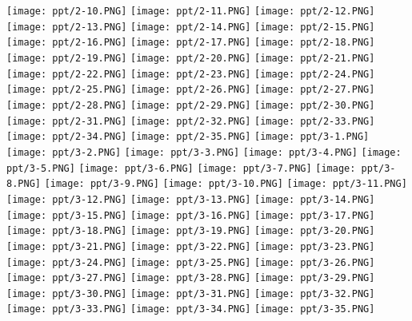 \documentclass[UTF-8]{ctexart}
\begin{document}
\begin{center}
\texttt{[image: ppt/2-10.PNG]}
\texttt{[image: ppt/2-11.PNG]}
\texttt{[image: ppt/2-12.PNG]}
\texttt{[image: ppt/2-13.PNG]}
\texttt{[image: ppt/2-14.PNG]}
\texttt{[image: ppt/2-15.PNG]}
\texttt{[image: ppt/2-16.PNG]}
\texttt{[image: ppt/2-17.PNG]}
\texttt{[image: ppt/2-18.PNG]}
\texttt{[image: ppt/2-19.PNG]}
\texttt{[image: ppt/2-20.PNG]}
\texttt{[image: ppt/2-21.PNG]}
\texttt{[image: ppt/2-22.PNG]}
\texttt{[image: ppt/2-23.PNG]}
\texttt{[image: ppt/2-24.PNG]}
\texttt{[image: ppt/2-25.PNG]}
\texttt{[image: ppt/2-26.PNG]}
\texttt{[image: ppt/2-27.PNG]}
\texttt{[image: ppt/2-28.PNG]}
\texttt{[image: ppt/2-29.PNG]}
\texttt{[image: ppt/2-30.PNG]}
\texttt{[image: ppt/2-31.PNG]}
\texttt{[image: ppt/2-32.PNG]}
\texttt{[image: ppt/2-33.PNG]}
\texttt{[image: ppt/2-34.PNG]}
\texttt{[image: ppt/2-35.PNG]}
\newpage
\texttt{[image: ppt/3-1.PNG]}
\texttt{[image: ppt/3-2.PNG]}
\texttt{[image: ppt/3-3.PNG]}
\texttt{[image: ppt/3-4.PNG]}
\texttt{[image: ppt/3-5.PNG]}
\texttt{[image: ppt/3-6.PNG]}
\texttt{[image: ppt/3-7.PNG]}
\texttt{[image: ppt/3-8.PNG]}
\texttt{[image: ppt/3-9.PNG]}
\texttt{[image: ppt/3-10.PNG]}
\texttt{[image: ppt/3-11.PNG]}
\texttt{[image: ppt/3-12.PNG]}
\texttt{[image: ppt/3-13.PNG]}
\texttt{[image: ppt/3-14.PNG]}
\texttt{[image: ppt/3-15.PNG]}
\texttt{[image: ppt/3-16.PNG]}
\texttt{[image: ppt/3-17.PNG]}
\texttt{[image: ppt/3-18.PNG]}
\texttt{[image: ppt/3-19.PNG]}
\texttt{[image: ppt/3-20.PNG]}
\texttt{[image: ppt/3-21.PNG]}
\texttt{[image: ppt/3-22.PNG]}
\texttt{[image: ppt/3-23.PNG]}
\texttt{[image: ppt/3-24.PNG]}
\texttt{[image: ppt/3-25.PNG]}
\texttt{[image: ppt/3-26.PNG]}
\texttt{[image: ppt/3-27.PNG]}
\texttt{[image: ppt/3-28.PNG]}
\texttt{[image: ppt/3-29.PNG]}
\texttt{[image: ppt/3-30.PNG]}
\texttt{[image: ppt/3-31.PNG]}
\texttt{[image: ppt/3-32.PNG]}
\texttt{[image: ppt/3-33.PNG]}
\texttt{[image: ppt/3-34.PNG]}
\texttt{[image: ppt/3-35.PNG]}

\end{center}
\end{document}
